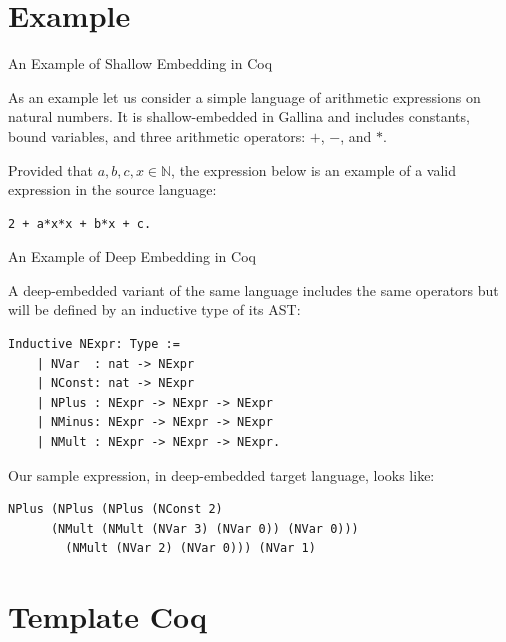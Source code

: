 \documentclass[aspectratio=169]{beamer}
\newcommand{\N}{\mathbb{N}}
\begin{document}
\section{Example}

\begin{frame}[fragile]{An Example of Shallow Embedding in Coq}

  As an example let us consider a simple language of arithmetic
  expressions on natural numbers. It is shallow-embedded in Gallina
  and includes constants, bound variables, and three arithmetic
  operators: $+$, $-$, and $*$.
  
  \medskip
  Provided that $a, b, c, x \in \N$, the expression below is an
  example of a valid expression in the source language:
  \medskip
  \begin{lstlisting}[language=Coq, mathescape=true, basicstyle=\large,
    frame=single]
    2 + a*x*x + b*x + c.
  \end{lstlisting}

\end{frame}

\begin{frame}[fragile]{An Example of Deep Embedding in Coq}

  A deep-embedded variant of the same language includes the same
  operators but will be defined by an inductive type of its AST:

  \begin{lstlisting}[language=Coq, mathescape=true,
    frame=single, basicstyle=\footnotesize]
    Inductive NExpr: Type :=
    | NVar  : nat -> NExpr 
    | NConst: nat -> NExpr
    | NPlus : NExpr -> NExpr -> NExpr
    | NMinus: NExpr -> NExpr -> NExpr
    | NMult : NExpr -> NExpr -> NExpr.
  \end{lstlisting}

  Our sample expression, in deep-embedded target language, looks like:
  
  \begin{lstlisting}[language=Coq, mathescape=true,
    basicstyle=\footnotesize, frame=single]
    NPlus (NPlus (NPlus (NConst 2)
      (NMult (NMult (NVar 3) (NVar 0)) (NVar 0)))
        (NMult (NVar 2) (NVar 0))) (NVar 1)
  \end{lstlisting}
  
\end{frame}

\section{Template Coq}
\end{document}
